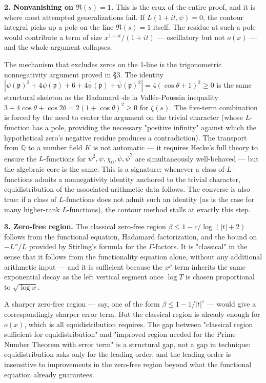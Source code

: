 \documentclass[12pt,a4paper]{article}
\newcommand{\pilcrow}{\S}
\begin{document}
\textbf{2. Nonvanishing on $\Re(s) = 1$.} This is the crux of the entire proof, and it is where most attempted generalizations fail. If $L(1+it, \psi) = 0$, the contour integral picks up a pole on the line $\Re(s) = 1$ itself. The residue at such a pole would contribute a term of size $x^{1+it}/(1+it)$ --- oscillatory but not $o(x)$ --- and the whole argument collapses.

The mechanism that excludes zeros on the 1-line is the trigonometric nonnegativity argument proved in \pilcrow{}3. The identity $|\psi(\mathfrak{p})^{2} + 4\psi(\mathfrak{p}) + 6 + 4\overline{\psi}(\mathfrak{p}) + \overline{\psi}(\mathfrak{p})^{2}| = 4(\cos\theta + 1)^2 \geq 0$ is the same structural skeleton as the Hadamard--de la Vallée-Poussin inequality $3 + 4\cos\theta + \cos 2\theta = 2(1+\cos\theta)^2 \geq 0$ for $\zeta(s)$. The five-term combination is forced by the need to center the argument on the trivial character (whose $L$-function has a pole, providing the necessary "positive infinity" against which the hypothetical zero's negative residue produces a contradiction). The transport from $\mathbb{Q}$ to a number field $K$ is not automatic --- it requires Hecke's full theory to ensure the $L$-functions for $\psi^2, \psi, \chi_0, \overline{\psi}, \overline{\psi}^2$ are simultaneously well-behaved --- but the algebraic core is the same. This is a signature: whenever a class of $L$-functions admits a nonnegativity identity anchored to the trivial character, equidistribution of the associated arithmetic data follows. The converse is also true: if a class of $L$-functions does not admit such an identity (as is the case for many higher-rank $L$-functions), the contour method stalls at exactly this step.

\textbf{3. Zero-free region.} The classical zero-free region $\beta \leq 1 - c/\log(|t|+2)$ follows from the functional equation, Hadamard factorization, and the bound on $-L''/L$ provided by Stirling's formula for the $\Gamma$-factors. It is "classical" in the sense that it follows from the functionality equation alone, without any additional arithmetic input --- and it is sufficient because the $x^\rho$ term inherits the same exponential decay as the left vertical segment once $\log T$ is chosen proportional to $\sqrt{\log x}$.

A sharper zero-free region --- say, one of the form $\beta \leq 1 - 1/|t|^\varepsilon$ --- would give a correspondingly sharper error term. But the classical region is already enough for $o(x)$, which is all equidistribution requires. The gap between "classical region sufficient for equidistribution" and "improved region needed for the Prime Number Theorem with error term" is a structural gap, not a gap in technique: equidistribution asks only for the leading order, and the leading order is insensitive to improvements in the zero-free region beyond what the functional equation already guarantees.
\end{document}
